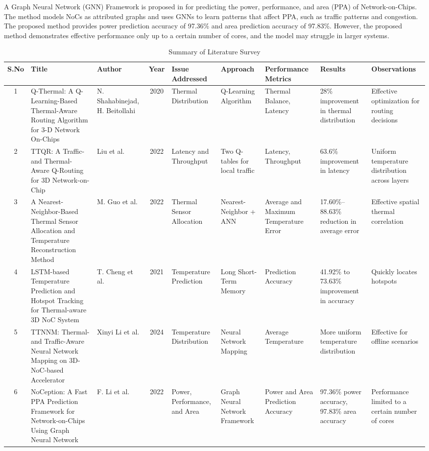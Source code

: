 \documentclass[conference]{IEEEtran}
\begin{document}
A Graph Neural Network (GNN) Framework is proposed in \cite{gnn_framework} for predicting the power, performance, and area (PPA) of Network-on-Chips. The method models NoCs as attributed graphs and uses GNNs to learn patterns that affect PPA, such as traffic patterns and congestion. The proposed method provides power prediction accuracy of 97.36\% and area prediction accuracy of 97.83\%. However, the proposed method demonstrates effective performance only up to a certain number of cores, and the model may struggle in larger systems.



\begin{table*}[htbp]
    \centering
    \caption*{Summary of Literature Survey} %
    \begin{tabularx}{\textwidth}{|c|X|X|c|X|X|X|X|X|} %
        \hline
        S.No & Title & Author & Year & Issue Addressed & Approach & Performance Metrics & Results & Observations \\
        \hline
        1 & Q-Thermal: A Q-Learning-Based Thermal-Aware Routing Algorithm for 3-D Network On-Chips & N. Shahabinejad, H. Beitollahi & 2020 & Thermal Distribution & Q-Learning Algorithm & Thermal Balance, Latency & 28\% improvement in thermal distribution & Effective optimization for routing decisions \\
        \hline
        2 & TTQR: A Traffic- and Thermal-Aware Q-Routing for 3D Network-on-Chip & Liu et al. & 2022 & Latency and Throughput & Two Q-tables for local traffic & Latency, Throughput & 63.6\% improvement in latency & Uniform temperature distribution across layers \\
        \hline
        3 & A Nearest-Neighbor-Based Thermal Sensor Allocation and Temperature Reconstruction Method & M. Guo et al. & 2022 & Thermal Sensor Allocation & Nearest-Neighbor + ANN & Average and Maximum Temperature Error & 17.60\%–88.63\% reduction in average error & Effective spatial thermal correlation \\
        \hline
        4 & LSTM-based Temperature Prediction and Hotspot Tracking for Thermal-aware 3D NoC System & T. Cheng et al. & 2021 & Temperature Prediction & Long Short-Term Memory & Prediction Accuracy & 41.92\% to 73.63\% improvement in accuracy & Quickly locates hotspots \\
        \hline
        5 & TTNNM: Thermal- and Traffic-Aware Neural Network Mapping on 3D-NoC-based Accelerator & Xinyi Li et al. & 2024 & Temperature Distribution & Neural Network Mapping & Average Temperature & More uniform temperature distribution & Effective for offline scenarios \\
        \hline
        6 & NoCeption: A Fast PPA Prediction Framework for Network-on-Chips Using Graph Neural Network & F. Li et al. & 2022 & Power, Performance, and Area & Graph Neural Network Framework & Power and Area Prediction Accuracy & 97.36\% power accuracy, 97.83\% area accuracy & Performance limited to a certain number of cores \\


\end{tabularx}
\end{table*}
\end{document}
